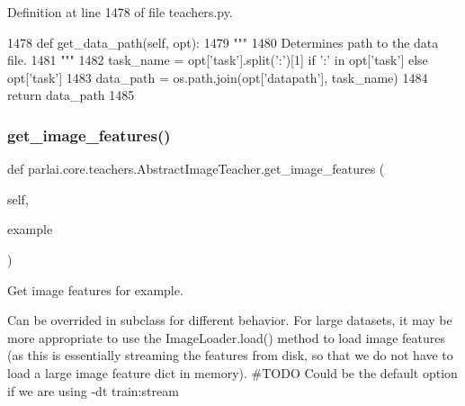 Definition at line 1478 of file teachers.\+py.


\begin{DoxyCode}
1478     \textcolor{keyword}{def }get\_data\_path(self, opt):
1479         \textcolor{stringliteral}{"""}
1480 \textcolor{stringliteral}{        Determines path to the data file.}
1481 \textcolor{stringliteral}{        """}
1482         task\_name = opt[\textcolor{stringliteral}{'task'}].split(\textcolor{stringliteral}{':'})[1] \textcolor{keywordflow}{if} \textcolor{stringliteral}{':'} \textcolor{keywordflow}{in} opt[\textcolor{stringliteral}{'task'}] \textcolor{keywordflow}{else} opt[\textcolor{stringliteral}{'task'}]
1483         data\_path = os.path.join(opt[\textcolor{stringliteral}{'datapath'}], task\_name)
1484         \textcolor{keywordflow}{return} data\_path
1485 
\end{DoxyCode}
\mbox{\label{classparlai_1_1core_1_1teachers_1_1AbstractImageTeacher_a3e1f85a8de230d8733272bd1e860cd92}} 
\subsubsection{\texorpdfstring{get\+\_\+image\+\_\+features()}{get\_image\_features()}}
{\footnotesize\ttfamily def parlai.\+core.\+teachers.\+Abstract\+Image\+Teacher.\+get\+\_\+image\+\_\+features (\begin{DoxyParamCaption}\item[{}]{self,  }\item[{}]{example }\end{DoxyParamCaption})}

\begin{DoxyVerb}Get image features for example.

Can be overrided in subclass for different behavior. For large datasets, it may
be more appropriate to use the ImageLoader.load() method to load image features
(as this is essentially streaming the features from disk, so that we do not have
to load a large image feature dict in memory). #TODO Could be the default option
if we are using -dt train:stream
\end{DoxyVerb}
 

